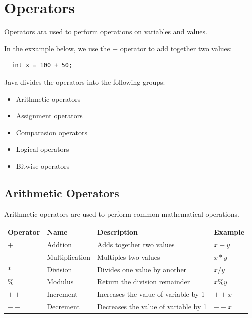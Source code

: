 \section{Operators}


Operators ara used to perform operations on variables and values.

In the exxample below, we use the $+$ operator to add together two values: 

\begin{verbatim}
  int x = 100 + 50;
\end{verbatim}

Java divides the operators into the following groups: 

\begin{itemize}
  \item Arithmetic operators 
  \item Assignment operators
  \item Comparasion operators
  \item Logical operators
  \item Bitwise operators
\end{itemize}

\subsection{Arithmetic Operators}

Arithmetic operators are used to perform common mathematical operations.

\begin{center}
\begin{tabular}[t]{l l l l}
  {\bf Operator} & {\bf Name}     & {\bf Description}                    & {\bf Example} \\
       $+$       & Addtion        & Adds together two values             & $x+y$ \\
       $-$       & Multiplication & Multiples two values                 & $x*y$ \\
       $*$       & Division       & Divides one value by another         & $x/y$ \\
       $\%$      & Modulus        & Return the division remainder        & $x\% y$ \\
       $++$      & Increment      & Increases the value of variable by 1 & $++x$ \\
       $--$      & Decrement      & Decreases the value of variable by 1 & $--x$ \\
\end{tabular}
\end{center}

